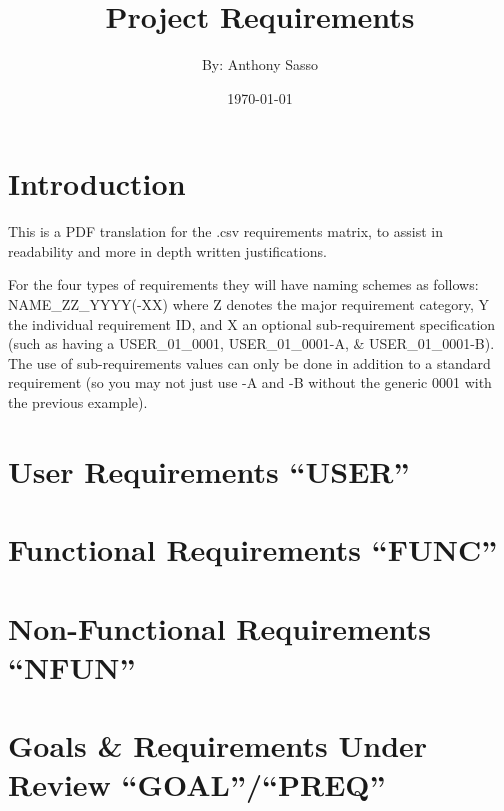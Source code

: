 \documentclass{article}
\title      {\Huge Project Requirements}
\author     {By: Anthony Sasso}
\date       {\today}
\begin{document}
\maketitle

\tableofcontents

\newpage
\section{Introduction}
This is a PDF translation for the .csv requirements matrix, to assist in readability and more in depth written justifications.

For the four types of requirements they will have naming schemes as follows: NAME\_ZZ\_YYYY(-XX) where Z denotes the major requirement category, Y the individual requirement ID, and X an optional sub-requirement specification (such as having a USER\_01\_0001, USER\_01\_0001-A, \& USER\_01\_0001-B). The use of sub-requirements values can only be done in addition to a standard requirement (so you may not just use -A and -B without the generic 0001 with the previous example).

\section{User Requirements ``USER''}

\section{Functional Requirements ``FUNC''}

\section{Non-Functional Requirements ``NFUN''}

\section{Goals \& Requirements Under Review ``GOAL''/``PREQ''}
\end{document}
